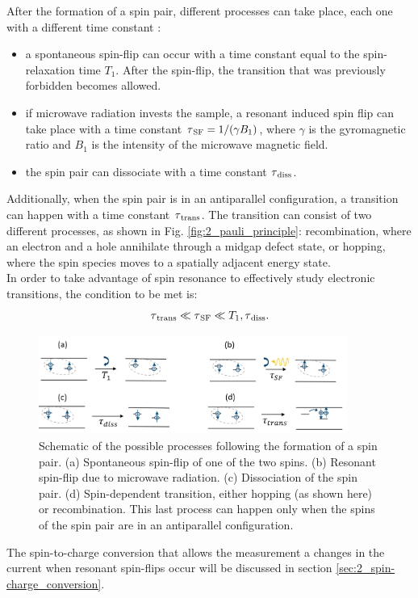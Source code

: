 \documentclass[a4paper]{book}
\newcommand{\tsub}{\textsubscript}
\begin{document}
	After the formation of a spin pair, different processes can take place, each one with a different time constant \cite{stutzmannSpindependentProcessesAmorphous2000}:
	\begin{itemize}
		\item a spontaneous spin-flip can occur with a time constant equal to the spin-relaxation time $T_1$. After the spin-flip, the transition that was previously forbidden becomes allowed.
		\item if microwave radiation invests the sample, a resonant induced spin flip can take place with a time constant $\tau\tsub{SF} = 1/(\gamma B_1)$, where $\gamma$ is the gyromagnetic ratio and $B_1$ is the intensity of the microwave magnetic field.
		\item the spin pair can dissociate with a time constant $\tau\tsub{diss}$.
	\end{itemize}
	Additionally, when the spin pair is in an antiparallel configuration, a transition can happen with a time constant $\tau\tsub{trans}$. The transition can consist of two different processes, as shown in Fig. \ref{fig:2_pauli_principle}: recombination, where an electron and a hole annihilate through a midgap defect state, or hopping, where the spin species moves to a spatially adjacent energy state.\\
	In order to take advantage of spin resonance to effectively study electronic transitions, the condition to be met is:
	\begin{equation}
		\tau\tsub{trans} \ll \tau\tsub{SF} \ll T_1, \tau\tsub{diss}.
		\label{eq:3_tau_relations} 
	\end{equation}
	\begin{figure}
		\centering
		\includegraphics[width=0.9\textwidth]{images/2_stutzmann_transitions}
		\caption{Schematic of the possible processes following the formation of a spin pair. (a) Spontaneous spin-flip of one of the two spins. (b) Resonant spin-flip due to microwave radiation. (c) Dissociation of the spin pair. (d) Spin-dependent transition, either hopping (as shown here) or recombination. This last process can happen only when the spins of the spin pair are in an antiparallel configuration.}
		\label{fig:2_stutzmann_transitions}
	\end{figure}
	The spin-to-charge conversion that allows the measurement a changes in the current when resonant spin-flips occur will be discussed in section \ref{sec:2_spin-charge_conversion}.\\
	
\end{document}
